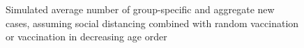 \documentclass[12pt]{article}
\begin{document}
\begin{figure}[hp]%
\caption
{Simulated average number of group-specific and aggregate new cases, assuming social distancing combined with random vaccination or vaccination in decreasing age order}%
\label{fig: vacc_priority_pct50}%
\vspace{-0.2cm}%
\footnotesize



\end{figure}
\end{document}
